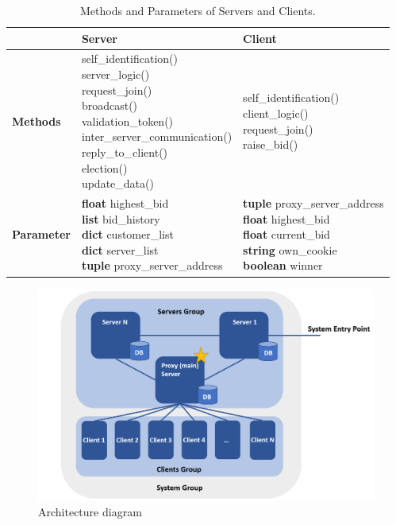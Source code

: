 \begin{table}
\caption{Methods and Parameters of Servers and Clients.}\label{tab1}
\begin{tabular}{|l|l|l|}
\hline
& {\bfseries Server} & {\bfseries Client}\\
\hline
{\bfseries Methods} & \tabincell{}{self\_identification()\\server\_logic()\\request\_join()\\broadcast()\\ validation\_token()\\inter\_server\_communication()\\reply\_to\_client()\\election()\\
update\_data()\\
} & \tabincell{}{self\_identification()\\client\_logic()\\request\_join()\\raise\_bid()}\\
\hline
{\bfseries Parameter} & \tabincell{}{{\bfseries float} highest\_bid\\{\bfseries list} bid\_history\\
{\bfseries dict} customer\_list\\{\bfseries dict} server\_list\\
{\bfseries tuple} proxy\_server\_address} & \tabincell{}{{\bfseries tuple} proxy\_server\_address\\
{\bfseries float} highest\_bid\\{\bfseries float} current\_bid\\{\bfseries string} own\_cookie\\
{\bfseries boolean} winner}\\
\hline
\end{tabular}
\end{table}

\begin{figure}
\includegraphics[width=\textwidth]{System Architecture.png}
\caption{Architecture diagram} \label{fig1}
\end{figure}

